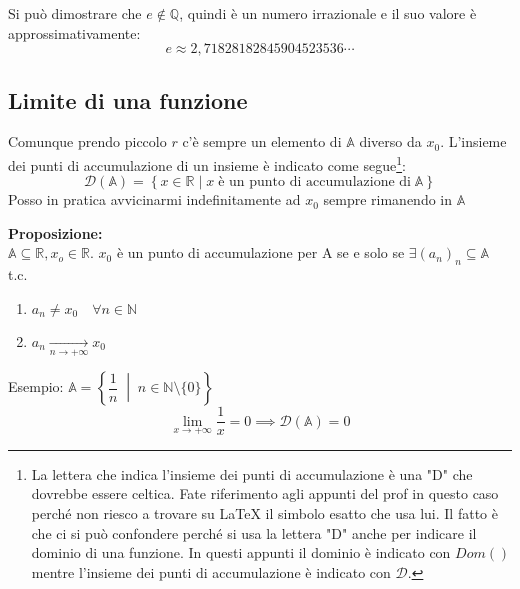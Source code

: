 Si può dimostrare che $e \notin \mathbb{Q}$, quindi è un numero irrazionale e il suo valore è approssimativamente:
\begin{equation*}
    e \approx 2,71828 18284 59045 23536 \cdots
\end{equation*}

\subsection{Limite di una funzione}

\dfn{
\textbf{Intorno sferico di un punto} $x_0 \in \mathbb{R}$ di raggio $r$:
    \begin{equation*}
        x_0 \in \mathbb{R}, r\in \mathbb{R} : r > 0
    \end{equation*}
    \begin{equation*}
        I_r (x_o) = \left\{x\in \mathbb{R} : \; |x-x_0| < r \right\}
    \end{equation*}
    Che in pratica risulta:
    \begin{equation*}
        I_r (x_0) = ]x_0-r, x_0+r[
    \end{equation*}
}

Comunque prendo piccolo $r$ c'è sempre un elemento di $\mathbb{A}$ diverso da $x_0$. L'insieme dei punti di accumulazione di un insieme è indicato come segue\footnote{La lettera che indica l'insieme dei punti di accumulazione è una "D" che dovrebbe essere celtica. Fate riferimento agli appunti del prof in questo caso perché non riesco a trovare su \LaTeX\; il simbolo esatto che usa lui. Il fatto è che ci si può confondere perché si usa la lettera "D" anche per indicare il dominio di una funzione. In questi appunti il dominio è indicato con $Dom()$ mentre l'insieme dei punti di accumulazione è indicato con $\mathcal{D}$.}:
\begin{equation*}
	\mathcal{D} (\mathbb{A}) = \left\{ x \in \mathbb{R}\; |\; x\; \text{è un punto di accumulazione di}\; \mathbb{A} \right\}
\end{equation*}
Posso in pratica avvicinarmi indefinitamente ad $x_0$ sempre rimanendo in $\mathbb{A}$

\textbf{Proposizione:}\\
$\mathbb{A} \subseteq \mathbb{R}, x_o \in \mathbb{R}$. $x_0$ è un punto di accumulazione per A se e solo se $\exists (a_n)_n \subseteq \mathbb{A}$ t.c.
\begin{enumerate}
	\item $a_n \neq x_0 \quad \forall n \in \mathbb{N}$
	\item $a_n \xrightarrow[n\to +\infty]{} x_0$
\end{enumerate}
Esempio:
$\mathbb{A} = \left\{\dfrac{1}{n} \;\middle|\; n \in \mathbb{N} \setminus \{0\} \right\}$
\begin{equation*}
    \lim_{x\to + \infty} \dfrac{1}{x} = 0 \implies \mathcal{D}(\mathbb{A}) = {0}
\end{equation*}

